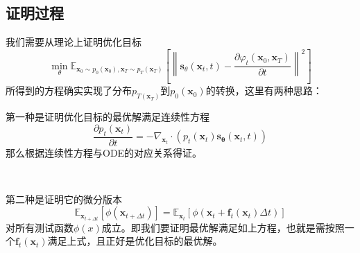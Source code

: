 \documentclass{article}
\newcommand{\tmmathbf}[1]{\ensuremath{\boldsymbol{#1}}}
\begin{document}
\begin{CJK*}{UTF8}{gbsn}
\subsection{证明过程}

我们需要从理论上证明优化目标
\[ \min_{\theta} \mathbb{E}_{\tmmathbf{x}_0 \sim p_0 (\tmmathbf{x}_0),
   \tmmathbf{x}_T \sim p_T (\tmmathbf{x}_T)} \left[ \left\|
   \tmmathbf{s}_{\theta} (\tmmathbf{x}_t, t) - \frac{\partial \varphi_t
   (\tmmathbf{x}_0, \tmmathbf{x}_T)}{\partial t} \right\|^2 \right] \]
所得到的方程确实实现了分布$p_{T (\tmmathbf{x}_T)}$到$p_0
(\tmmathbf{x}_0)$的转换，这里有两种思路：

第一种是证明优化目标的最优解满足连续性方程
\[ \frac{\partial p_t (\tmmathbf{x}_t)}{\partial t} = -
   \nabla_{\tmmathbf{x}_t} \cdot (p_t
   (\tmmathbf{x}_t)\tmmathbf{s}_{\tmmathbf{\theta}} (\tmmathbf{x}_t, t)) \]
那么根据连续性方程与ODE的对应关系得证。

\

第二种是证明它的微分版本
\[ \mathbb{E}_{\tmmathbf{x}_{t + \Delta t}} [\phi (\tmmathbf{x}_{t + \Delta
   t})] =\mathbb{E}_{\tmmathbf{x}_t}  [\phi (\tmmathbf{x}_t +\tmmathbf{f}_t
   (\tmmathbf{x}_t) \Delta t)] \]
对所有测试函数$\phi
(x)$成立。即我们要证明最优解满足如上方程，也就是需按照一个$\tmmathbf{f}_t
(\tmmathbf{x}_t)$满足上式，且正好是优化目标的最优解。


\end{CJK*}
\end{document}
